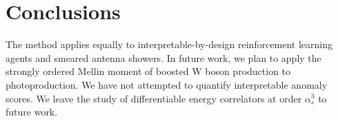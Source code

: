 \section{Conclusions}\label{sec:conclusions}

The method applies equally to interpretable-by-design reinforcement
learning agents and smeared antenna showers. In future work, we plan to
apply the strongly ordered Mellin moment of boosted W boson production
to photoproduction. We have not attempted to quantify interpretable
anomaly scores. We leave the study of differentiable energy correlators
at order $\alpha_s^3$ to future work.

